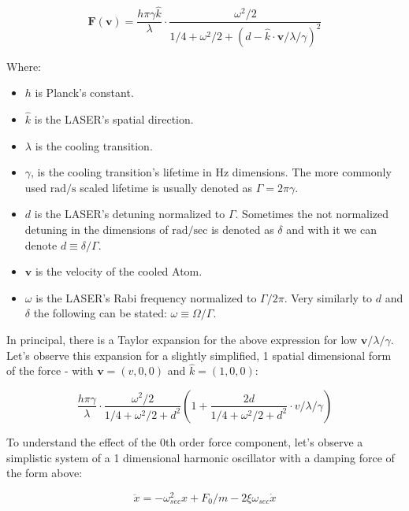 \begin{equation}
	\mathbf{F}(\mathbf{v}) = \frac{h \pi \gamma \hat{k}}{\lambda} \cdot \frac{\omega^2/2}{1/4 + \omega^2/2 + (d - \hat{k}\cdot\mathbf{v}/\lambda/\gamma)^2}
	\label{eq:laser-cool-force}
\end{equation}

Where:

\begin{itemize}
	\item $h$ is Planck's constant.
	\item $\hat{k}$ is the LASER's spatial direction.
	\item $\lambda$ is the cooling transition.
	\item $\gamma$, is the cooling transition's lifetime in Hz dimensions. The more commonly used $\mathrm{rad}/\mathrm{s}$ scaled lifetime is usually denoted as $\Gamma = 2\pi \gamma$.
	\item $d$ is the LASER's detuning normalized to $\Gamma$. Sometimes the not normalized detuning in the dimensions of $\mathrm{rad}/\mathrm{sec}$ is denoted as $\delta$ and with it we can denote $d \equiv \delta/\Gamma$.
	\item $\mathbf{v}$ is the velocity of the cooled Atom.
	\item $\omega$ is the LASER's Rabi frequency normalized to $\Gamma/2\pi$. Very similarly to $d$ and $\delta$ the following can be stated: $\omega \equiv \Omega/\Gamma$.
\end{itemize}

In principal, there is a Taylor expansion for the above expression for low $\mathbf{v}/\lambda/\gamma$. Let's observe this expansion for a slightly simplified, 1 spatial dimensional form of the force - with $\mathbf{v} = (v,0,0)$ and $\hat{k} = (1,0,0)$:

\begin{equation}
	\frac{h \pi \gamma}{\lambda} \cdot \frac{\omega^2/2}{1/4 + \omega^2/2 + d^2} \left(
		1 + \frac{2d}{1/4 + \omega^2/2 + d^2} \cdot v/\lambda/\gamma
	\right)
	\label{eq:laser-cool-taylor-force}
\end{equation}

To understand the effect of the 0th order force component, let's observe a simplistic system of a 1 dimensional harmonic oscillator with a damping force of the form above:

\begin{equation}
	\ddot{x} = - \omega_{sec}^2 x + F_0/m - 2 \xi \omega_{sec} \dot{x}
\end{equation}


